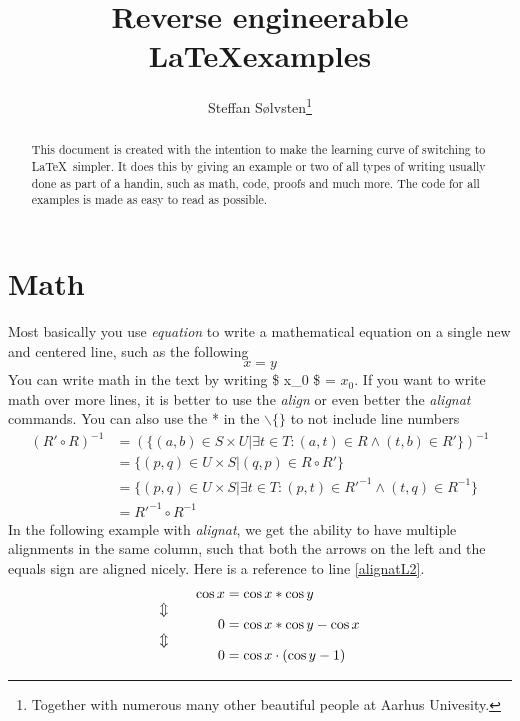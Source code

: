 \documentclass[a4, english]{article}
\title{{\LARGE Reverse engineerable \LaTeX examples}}
\author{Steffan Sølvsten\footnote{Together with numerous many other beautiful
    people at Aarhus Univesity.}}
\affil{Aarhus University \\ \mailto{soelvsten@cs.au.dk}}
\begin{document}
\maketitle

\begin{abstract}
  This document is created with the intention to make the learning curve of
  switching to \LaTeX\ simpler. It does this by giving an example or two of all
  types of writing usually done as part of a handin, such as math, code, proofs
  and much more. The code for all examples is made as easy to read as possible.
\end{abstract}

\newpage
\tableofcontents

\newpage
\section{Math} \label{sec:math}
Most basically you use \emph{equation} to write a mathematical equation on a
single new and centered line, such as the following
\begin{equation}
  x = y
\end{equation}
You can write math in the text by writing \$ x\_0 \$ = $x_0$. If you want to
write math over more lines, it is better to use the \emph{align} or even better
the \emph{alignat} commands. You can also use the * in the
$\backslash$$\{$$\}$ to not include line numbers
\begin{align*}
  (R' \circ R)^{-1}
    &= (\{(a,b) \in S \times U | \exists t \in T: (a,t) \in R \wedge (t,b) \in R'\})^{-1}
\\
    &= \{(p,q) \in U \times S | (q,p) \in R \circ R' \}
\\
    &= \{(p,q) \in U \times S | \exists t \in T : (p,t) \in R'^{-1} \wedge (t,q) \in R^{-1}\}
\\
    &= R'^{-1} \circ R^{-1}
\end{align*}
In the following example with \emph{alignat}, we get the ability to have
multiple alignments in the same column, such that both the arrows on the left
and the equals sign are aligned nicely. Here is a reference to line
\ref{alignatL2}.
\begin{alignat}{2}
    && \cos x &= \cos x * \cos y \label{alignatL1}
\\ \ArrowBetweenLines
    && 0 &= \cos x * \cos y - \cos x \label{alignatL2}
\\ \ArrowBetweenLines
    && 0 &= \cos x \cdot (\cos y - 1) \label{alignatL3}
\end{alignat}
\end{document}
